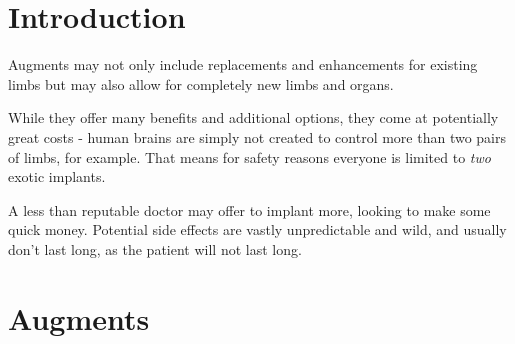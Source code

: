 \documentclass[12pt,a4paper,openany,usenames,dvipsnames]{book}
\begin{document}
	

    \chapter{Introduction}
    Augments may not only include replacements and enhancements for existing limbs but may also allow for completely new limbs and organs.
    \par
    While they offer many benefits and additional options, they come at potentially great costs
    	- human brains are simply not created to control more than two pairs of limbs, for example.
   	That means for safety reasons everyone is limited to \emph{two} exotic implants.
    \par
    A less than reputable doctor may offer to implant more, looking to make some quick money. Potential side effects are vastly unpredictable and wild, and usually don't last long, as the patient will not last long.

    \chapter{Augments}
    \vspace{-10mm}
\end{document}
